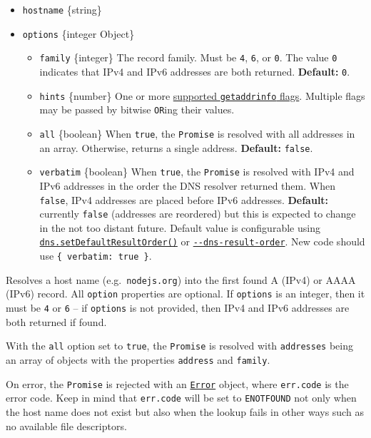 \begin{itemize}
\tightlist
\item
  \texttt{hostname} \{string\}
\item
  \texttt{options} \{integer \textbar{} Object\}

  \begin{itemize}
  \tightlist
  \item
    \texttt{family} \{integer\} The record family. Must be \texttt{4},
    \texttt{6}, or \texttt{0}. The value \texttt{0} indicates that IPv4
    and IPv6 addresses are both returned. \textbf{Default:} \texttt{0}.
  \item
    \texttt{hints} \{number\} One or more
    \hyperref[supported-getaddrinfo-flags]{supported
    \texttt{getaddrinfo} flags}. Multiple flags may be passed by bitwise
    \texttt{OR}ing their values.
  \item
    \texttt{all} \{boolean\} When \texttt{true}, the \texttt{Promise} is
    resolved with all addresses in an array. Otherwise, returns a single
    address. \textbf{Default:} \texttt{false}.
  \item
    \texttt{verbatim} \{boolean\} When \texttt{true}, the
    \texttt{Promise} is resolved with IPv4 and IPv6 addresses in the
    order the DNS resolver returned them. When \texttt{false}, IPv4
    addresses are placed before IPv6 addresses. \textbf{Default:}
    currently \texttt{false} (addresses are reordered) but this is
    expected to change in the not too distant future. Default value is
    configurable using
    \hyperref[dnssetdefaultresultorderorder]{\texttt{dns.setDefaultResultOrder()}}
    or
    \href{cli.md\#--dns-result-orderorder}{\texttt{-\/-dns-result-order}}.
    New code should use \texttt{\{\ verbatim:\ true\ \}}.
  \end{itemize}
\end{itemize}

Resolves a host name
(e.g.~\texttt{\textquotesingle{}nodejs.org\textquotesingle{}}) into the
first found A (IPv4) or AAAA (IPv6) record. All \texttt{option}
properties are optional. If \texttt{options} is an integer, then it must
be \texttt{4} or \texttt{6} -- if \texttt{options} is not provided, then
IPv4 and IPv6 addresses are both returned if found.

With the \texttt{all} option set to \texttt{true}, the \texttt{Promise}
is resolved with \texttt{addresses} being an array of objects with the
properties \texttt{address} and \texttt{family}.

On error, the \texttt{Promise} is rejected with an
\href{errors.md\#class-error}{\texttt{Error}} object, where
\texttt{err.code} is the error code. Keep in mind that \texttt{err.code}
will be set to \texttt{\textquotesingle{}ENOTFOUND\textquotesingle{}}
not only when the host name does not exist but also when the lookup
fails in other ways such as no available file descriptors.

